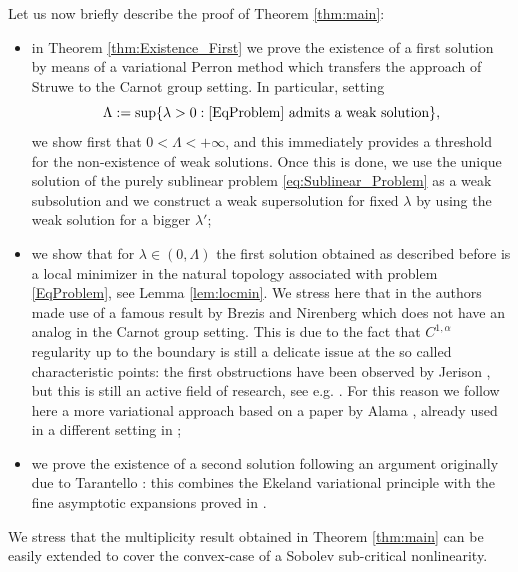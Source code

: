 \documentclass[11pt]{amsart}
\numberwithin{equation}{section} %
\theoremstyle{definition}
\begin{document}
Let us now briefly describe the proof of Theorem \ref{thm:main}: 
\begin{itemize}
	\item in Theorem \ref{thm:Existence_First} we prove the existence of a first solution by means of a variational Perron method which transfers the approach of Struwe \cite{Struwe} to the Carnot group setting. In particular, setting
	\begin{equation*}
	\Lambda := \sup \{ \lambda >0: \eqref{EqProblem} \textrm{ admits a weak solution}\},
\end{equation*}
	\noindent we show first that $0<\Lambda<+\infty$, and this immediately provides a threshold for the non-existence of weak solutions. Once this is done, we use the unique solution of the purely sublinear problem \eqref{eq:Sublinear_Problem} as a weak subsolution and we construct a weak supersolution for fixed $\lambda$ by using the weak solution for a bigger $\lambda'$; 
	\item we show that for $\lambda \in (0,\Lambda)$ the first solution obtained as described before is a local minimizer in the natural topology associated with problem \eqref{EqProblem}, see Lemma \ref{lem:locmin}. We stress here that in \cite{ABC} the authors made use of a famous result by Brezis and Nirenberg \cite{BNH1C1} which does not have an analog in the Carnot group setting. This is due to the fact that $C^{1,\alpha}$ regularity up to the boundary is still a delicate issue at the so called characteristic points: the first obstructions have been observed by Jerison \cite{Jerison,Jerison2}, but this is still an active field of research, see e.g. \cite{BaCiCu,BaGaMu,AbTr}. For this reason we follow here a more variational approach based on a paper by Alama \cite{Alama}, already used in a different setting in \cite{AbDiVa};
	\item we prove the existence of a second solution following an argument originally due to Tarantello \cite{Tarantello}: this combines the Ekeland variational principle \cite{Ekeland} with the fine asymptotic expansions proved in \cite{Loiudice1}.
\end{itemize} 

\medskip

We stress that the multiplicity result obtained in Theorem \ref{thm:main} can be easily extended to cover the convex-case of a Sobolev sub-critical nonlinearity.
\end{document}
